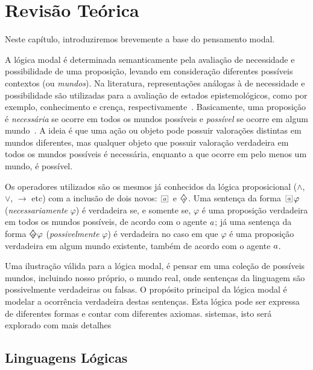 \chapter{Revisão Teórica}
\label{cap:teo}

Neste capítulo, introduziremos brevemente a base do pensamento modal. 

A lógica modal é determinada semanticamente pela avaliação de necessidade e
possibilidade de uma proposição, levando em consideração diferentes possíveis
contextos (ou \emph{mundos}). Na literatura, representações análogas à de
necessidade e possibilidade são utilizadas para a avaliação de estados
epistemológicos, como por exemplo, conhecimento e crença,
respectivamente~\cite{belief}. Basicamente, uma proposição é \textit{necessária}
se ocorre em todos os mundos possíveis e \textit{possível} se ocorre em algum
mundo~\cite{chellas:modal_logic}.  A ideia é que uma ação ou objeto pode
possuir valorações distintas em mundos diferentes, mas qualquer objeto que
possuir valoração verdadeira em todos os mundos possíveis é necessária, enquanto
a que ocorre em pelo menos um mundo, é possível.

Os operadores utilizados são os mesmos já conhecidos da lógica proposicional
($\wedge$, $\vee$, $\rightarrow$ etc) com a inclusão de dois novos:
$\nec{\agent}$ e $\pos{\agent}$. Uma sentença da forma $\nec{\agent} \varphi$
(\textit{necessariamente} $\varphi$) é verdadeira se, e somente se, $\varphi$ é
uma proposição verdadeira em todos os mundos possíveis, de acordo com o agente
$a$; já uma sentença da forma $\pos{\agent} \varphi$
(\textit{possivelmente} $\varphi$) é verdadeira no caso em que $\varphi$ é uma
proposição verdadeira em algum mundo existente, também de acordo com o agente
$a$.

Uma ilustração válida para a lógica modal, é pensar em uma coleção de possíveis
mundos, incluindo nosso próprio, o mundo real, onde sentenças da linguagem são
possivelmente verdadeiras ou falsas. O propósito principal da lógica modal é
modelar a ocorrência verdadeira destas sentenças. Esta lógica pode ser expressa
de diferentes formas e contar com diferentes axiomas. %
sistemas, isto será explorado com mais detalhes 

\section{Linguagens Lógicas}
\label{sec:linguagens}

